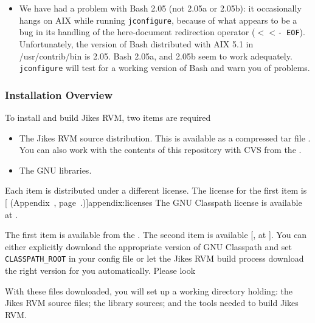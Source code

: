 \begin{itemize}
\item We have had a problem with Bash 2.05 (not
  2.05a or 2.05b): it occasionally hangs on AIX while running
  \texttt{jconfigure}, because of what appears to be a bug in its handling of
  the here-document redirection operator (\texttt{$<<$- EOF}).  Unfortunately, the
  version of Bash distributed with AIX 5.1 in /usr/contrib/bin is
  2.05.   Bash 2.05a, and 2.05b seem to work adequately.  
  \texttt{jconfigure} will test for a working version of Bash and warn
  you of problems.

\end{itemize}

\subsubsection{Installation Overview}\label{sec:installDetails}

To install and build Jikes\TMweb{} RVM, two items are required
\begin{itemize}
\item The Jikes RVM source distribution.  This is available as a
compressed tar file \texttt{\RVMTarFile}.  You can also work with the
contents of this repository with CVS from the 
.

\item The GNU 
 libraries. 
\end{itemize}

Each item is distributed under a different license.  The license for
the first item is [ (Appendix~\Ref, page~\Pageref.)]{appendix:licenses}
The GNU Classpath license is available at 
\xlink{\texttt{\classpathURL}}{\classpathURL}. 

The first item is available  from the . The second item is
available [, at \texttt{\classpathURL}]{\classpathURL}.
You can either explicitly download the appropriate version of GNU
Classpath and set \texttt{CLASSPATH\_ROOT} in your config file or let
the Jikes RVM build process download the right version for you
automatically.  Please look \AtManualClasspathRootDiscussion{}

With these files downloaded, you will set up 
a working directory holding: the Jikes RVM source files; the 
library sources; and the tools needed to build Jikes RVM.\@ 

